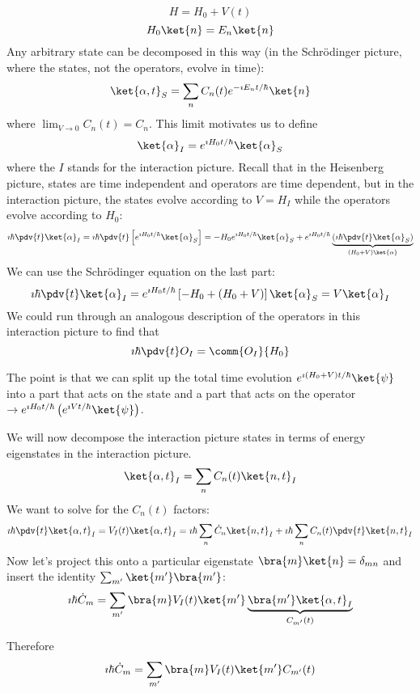 \documentclass[a4paper,twoside,master.tex]{subfiles}
\begin{document}
\begin{equation}
    H = H_0 + V(t)
\end{equation}
\begin{equation}
    H_0\ket{n} = E_n\ket{n}
\end{equation}
Any arbitrary state can be decomposed in this way (in the Schr\"odinger picture, where the states, not the operators, evolve in time):
\begin{equation}
    \ket{\alpha, t}_S = \sum_n C_n(t) e^{- \imath E_n t / \hbar}\ket{n}
\end{equation}
where $ \lim_{V \to 0} C_n(t) = C_n $. This limit motivates us to define
\begin{equation}
    \ket{\alpha}_I = e^{\imath H_0 t / \hbar}\ket{\alpha}_S
\end{equation}
where the $ I $ stands for the interaction picture. Recall that in the Heisenberg picture, states are time independent and operators are time dependent, but in the interaction picture, the states evolve according to $ V = H_I $ while the operators evolve according to $ H_0 $:
\begin{equation}
    \imath \hbar \pdv{t}\ket{\alpha}_I = \imath \hbar \pdv{t} \left[ e^{\imath H_0 t / \hbar}\ket{\alpha}_S \right] = - H_0 e^{\imath H_0 t / \hbar}\ket{\alpha}_S + e^{\imath H_0 t / \hbar}\underbrace{\left( \imath \hbar \pdv{t}\ket{\alpha}_S \right)}_{(H_0 + V)\ket{\alpha}}
\end{equation}
We can use the Schr\"odinger equation on the last part:
\begin{equation}
    \imath \hbar \pdv{t}\ket{\alpha}_I = e^{\imath H_0 t / \hbar} \left[ -H_0 + (H_0 + V) \right]\ket{\alpha}_S = V\ket{\alpha}_I
\end{equation}
We could run through an analogous description of the operators in this interaction picture to find that
\begin{equation}
    \imath \hbar \pdv{t}O_I = \comm{O_I}{H_0}
\end{equation}

The point is that we can split up the total time evolution $ e^{\imath (H_0 + V)t/\hbar}\ket{\psi} $ into a part that acts on the state and a part that acts on the operator $ \to e^{\imath H_0 t/\hbar} \left( e^{\imath V t/\hbar}\ket{\psi}\right) $.

We will now decompose the interaction picture states in terms of energy eigenstates in the interaction picture.
\begin{equation}
    \ket{\alpha, t}_I = \sum_n C_n(t)\ket{n, t}_I
\end{equation}
We want to solve for the $ C_n(t) $ factors:
\begin{equation}
    \imath \hbar \pdv{t}\ket{\alpha, t}_I = V_I(t)\ket{\alpha, t}_I = \imath \hbar \sum_n \dot{C}_n\ket{n, t}_I + \imath \hbar \sum_n C_n(t) \pdv{t}\ket{n, t}_I
\end{equation}
Now let's project this onto a particular eigenstate $\bra{m}\ket{n} = \delta_{mn} $ and insert the identity $ \sum_{m'}\ket{m'}\bra{m'} $:
\begin{equation}
    \imath \hbar \dot{C}_m = \sum_{m'}\bra{m} V_I(t)\ket{m'}\underbrace{\bra{m'}\ket{\alpha, t}_I}_{C_{m'}(t)}
\end{equation}

Therefore
\begin{equation}
    \imath \hbar \dot{C}_m = \sum_{m'}\bra{m} V_I(t)\ket{m'} C_{m'}(t)
\end{equation}
\end{document}
